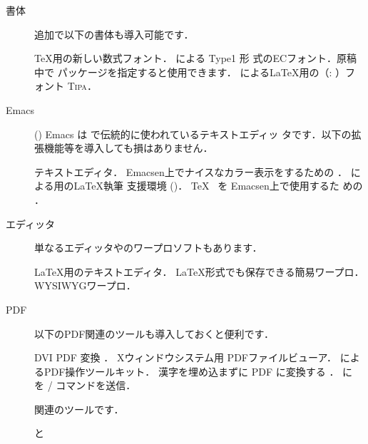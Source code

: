 \begin{description}
  \item[書体] 追加で以下の書体も導入可能です．
 \begin{rpmlist}
             \TeX 用の新しい数式フォント．
   による Type1 \PS 形
    式のECフォント．原稿中で パッケージを指定すると使用できます．
                による\LaTeX 用の（: ）フォント
    \textsc{Tipa}．
 \end{rpmlist}
 \item[Emacs] (\gnu) Emacs は \unixos で伝統的に使われているテキストエディッ
 タです．以下の拡張機能等を導入しても損はありません．
 \begin{rpmlist}
            テキストエディタ．
       Emacsen上でナイスなカラー表示をするための
  ．
            による\Emacs 用の\LaTeX 執筆
     支援環境  (\Prog[yatex]\YaTeX)．
     \TeX\  を Emacsen上で使用するた
  めの ．
 \end{rpmlist} 
\item[エディッタ] 単なるエディッタやのワープロソフトもあります．
\begin{rpmlist}
   \LaTeX 用のテキストエディタ．
         \LaTeX 形式でも保存できる簡易ワープロ．
     WYSIWYGワープロ．
\end{rpmlist} 
\item[PDF] 以下のPDF関連のツールも導入しておくと便利です．
\begin{rpmlist}
   DVI \textto PDF 変換\Prog[dvipdfmx]{\Dvipdfmx}   ．
       Xウィンドウシステム用 PDFファイルビューア\Xpdf．
      によるPDF操作ツールキット．
    漢字を埋め込まずに \PS \textto PDF に変換する
    ．
   に  を 
     / コマンドを送信．
\end{rpmlist} 
\item[\BibTeX] \BibTeX 関連のツールです．
\begin{rpmlist}
   と

\end{rpmlist}
\end{description}
